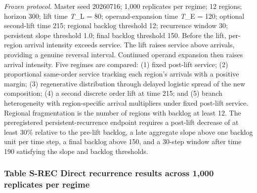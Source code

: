 \emph{Frozen protocol.} Master seed 20260716; 1,000 replicates per
regime; 12 regions; horizon 300; lift time \emph{T}\_L = 80;
operand-expansion time \emph{T}\_E = 120; optional second-lift time 215;
regional backlog threshold 12; recurrence window 30; persistent slope
threshold 1.0; final backlog threshold 150. Before the lift, per-region
arrival intensity exceeds service. The lift raises service above
arrivals, providing a genuine reversal interval. Continued operand
expansion then raises arrival intensity. Five regimes are compared: (1)
fixed post-lift service; (2) proportional same-order service tracking
each region's arrivals with a positive margin; (3) regenerative
distribution through delayed logistic spread of the new composition; (4)
a second discrete order lift at time 215; and (5) branch heterogeneity
with region-specific arrival multipliers under fixed post-lift service.
Regional fragmentation is the number of regions with backlog at least
12. The preregistered persistent-recurrence endpoint requires a
post-lift decrease of at least 30\% relative to the pre-lift backlog, a
late aggregate slope above one backlog unit per time step, a final
backlog above 150, and a 30-step window after time 190 satisfying the
slope and backlog thresholds.

\hypertarget{table-s-rec-direct-recurrence-results-across-1000-replicates-per-regime}{%
\subsubsection{Table S-REC \textbar{} Direct recurrence results across
1,000 replicates per
regime}\label{table-s-rec-direct-recurrence-results-across-1000-replicates-per-regime}}


